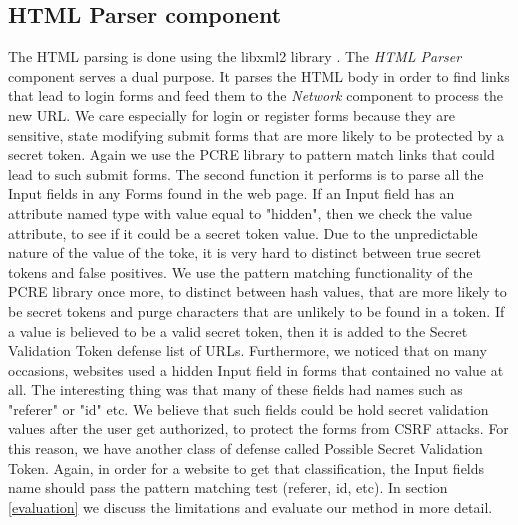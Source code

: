 \subsection{HTML Parser component}
The HTML parsing is done using the libxml2 library \cite{website:libxml}. The \emph{HTML Parser} component serves a dual 
purpose.  It parses the HTML body in order to find links that lead to login forms and feed them to the \emph{Network}
component to process the new URL.  We care especially for login or register forms because they are sensitive, state
modifying submit forms that are more likely to be protected by a secret token. Again we use the PCRE library to pattern
match links that could lead to such submit forms. The second function it performs is to parse all the Input fields in 
any Forms found in the web page.  If an Input field has an attribute named type with value equal to "hidden", then 
we check the value attribute, to see if it could be a secret token value.  Due to the unpredictable nature of the 
value of the toke, it is very hard to distinct between true secret tokens and false positives.  We use
the pattern matching functionality of the PCRE library once more, to distinct between hash values, that are more 
likely to be secret tokens and purge characters that are unlikely to be found in a token.  If a value is believed to
be a valid secret token, then it is added to the Secret Validation Token defense list of URLs.  Furthermore, we noticed
that on many occasions, websites used a hidden Input field in forms that contained no value at all.  The interesting thing
was that many of these fields had names such as "referer" or "id" etc.  We believe that such fields could be hold secret 
validation values after the user get authorized, to protect the forms from CSRF attacks.  For this reason, we have another
class of defense called Possible Secret Validation Token.  Again, in order for a website to get that classification, the
Input fields name should pass the pattern matching test (referer, id, etc).
In section \ref{evaluation} we discuss the limitations and evaluate our method in more detail.   

